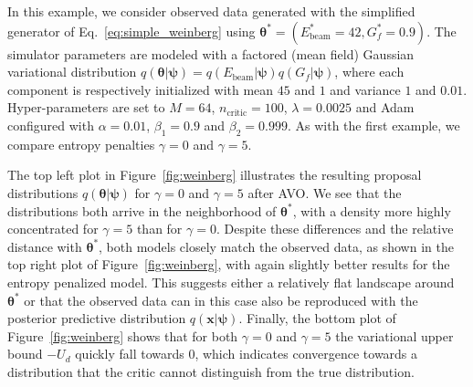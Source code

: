 \documentclass[twocolumn,superscriptaddress,aps]{revtex4-1}
\newcommand{\qxpsi}{q(\mathbf{x}|\bfpsi)}
\newcommand{\bftheta}{{\bm \theta}}
\newcommand{\bfpsi}{{\bm \psi}}
\newcommand{\bfz}{\mathbf{z}}
\theoremstyle{plain}
\begin{document}

In this example, we consider observed data generated with the simplified generator of Eq.~\ref{eq:simple_weinberg}
using $\bftheta^* = (E_\text{beam}^*=42, G_f^*=0.9)$. The simulator parameters are modeled with a
factored (mean field) Gaussian variational distribution $q(\bftheta|\bfpsi) = q(E_\text{beam}|\bfpsi)
q(G_f|\bfpsi)$, where each component is respectively initialized with mean $45$
and $1$ and variance $1$ and $0.01$. Hyper-parameters are set to $M=64$,
$n_\text{critic}=100$, $\lambda=0.0025$ and Adam configured with $\alpha=0.01$,
$\beta_1=0.9$ and $\beta_2=0.999$. As with the first example, we compare
entropy penalties $\gamma=0$ and $\gamma=5$.

The top left plot in Figure~\ref{fig:weinberg} illustrates the resulting
proposal distributions $q(\bftheta|\bfpsi)$ for $\gamma=0$ and $\gamma=5$ after
AVO. We see that the distributions both arrive
in the neighborhood of $\bftheta^*$, with a density  more highly concentrated for
$\gamma=5$ than for $\gamma=0$.  Despite these differences and the relative
distance with $\bftheta^*$, both models closely match the observed data, as shown
in the top right plot of  Figure~\ref{fig:weinberg}, with again slightly better
results for the entropy penalized model. This suggests either a relatively flat
landscape around $\bftheta^*$ or that the observed data can in this case also be
reproduced with the posterior predictive distribution $\qxpsi$.
Finally, the bottom plot of Figure~\ref{fig:weinberg} shows that for both
$\gamma=0$ and $\gamma=5$ the variational upper bound $-U_d$ quickly fall
towards $0$, which indicates  convergence towards a distribution that the critic
cannot distinguish from the true distribution. 
\end{document}
